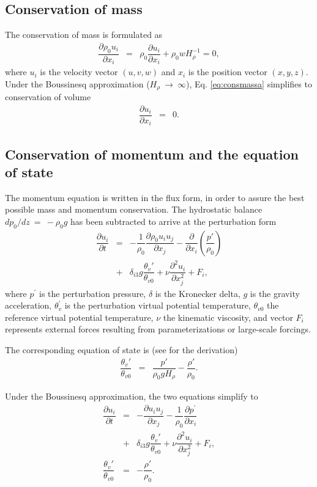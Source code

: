 \documentclass[gmd]{copernicus}
\begin{document}
\subsection{Conservation of mass}
The conservation of mass is formulated as
\begin{eqnarray}
\dfrac{\partial \rho_0 u_i}{\partial x_i} & = & \rho_0 \dfrac{\partial u_i}{\partial x_i} + \rho_0 w H_{\rho}^{-1} = 0, \label{eq:consmassa}
\end{eqnarray}
where $u_i$ is the velocity vector $(u,v,w)$ and $x_i$ is the position vector $(x,y,z)$.
Under the Boussinesq approximation ($H_{\rho}~\rightarrow~\infty$), Eq. \ref{eq:consmassa} simplifies to conservation of volume
\begin{eqnarray}
\dfrac{\partial u_i}{\partial x_i} & = & 0. \label{eq:consmassb}
\end{eqnarray}

\subsection{Conservation of momentum and the equation of state}
The momentum equation is written in the flux form, in order to assure the best possible mass and momentum conservation. The hydrostatic balance $dp_0 / dz~=~-\rho_0 g$ has been subtracted to arrive at the perturbation form
\begin{eqnarray}
\nonumber \dfrac{\partial u_i}{\partial t} & = & - \dfrac{1}{\rho_0} \dfrac{\partial \rho_0 u_i u_j}{\partial x_j} 
- \dfrac{\partial}{\partial x_i}\left(\dfrac{p'}{\rho_0}\right) \\
& + & \delta_{i3} g \dfrac{\theta_v'}{\theta_{v0}} + \nu \dfrac{\partial^2 u_i}{\partial x_j^2} + F_i,\label{eq:consmoma}
\end{eqnarray}
where $p^\prime$ is the perturbation pressure, $\delta$ is the Kronecker delta, $g$ is the gravity acceleration, $\theta_v^\prime$ is the perturbation virtual potential temperature,  $\theta_{v0}$ the reference virtual potential temperature, $\nu$ the kinematic viscosity, and vector $F_i$ represents external forces resulting from parameterizations or large-scale forcings.

The corresponding equation of state is (see \citet{Bannon1996} for the derivation)
\begin{eqnarray}
\dfrac{\theta_v'}{\theta_{v0}} & = & \dfrac{p'}{\rho_0 g H_{\rho}} - \dfrac{\rho'}{\rho_0}.\label{eq:statea}
\end{eqnarray}

Under the Boussinesq approximation, the two equations simplify to
\begin{eqnarray}
\nonumber \dfrac{\partial u_i}{\partial t} & = & - \dfrac{\partial u_i u_j}{\partial x_j} - \dfrac{1}{\rho_0}\dfrac{\partial p^\prime}{\partial x_i} \\
& + & \delta_{i3} g \dfrac{\theta_v'}{\theta_{v0}} + \nu \dfrac{\partial^2 u_i}{\partial x_j^2} + F_i \label{eq:consmomb},\\
\dfrac{\theta_v'}{\theta_{v0}} & = & - \dfrac{\rho'}{\rho_0}\label{eq:stateb}.
\end{eqnarray}
\end{document}
